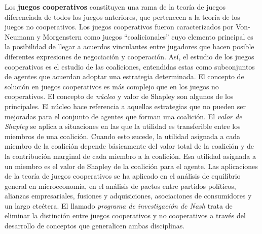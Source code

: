 \documentclass{nuevotema}
\begin{document}
Los \textbf{juegos cooperativos} constituyen una rama de la teoría de juegos diferenciada de todos los juegos anteriores, que pertenecen a la teoría de los juegos no cooperativos. Los juegos cooperativos fueron caracterizados por Von-Neumann y Morgenstern como juegos ``coalicionales'' cuyo elemento principal es la posibilidad de llegar a acuerdos vinculantes entre jugadores que hacen posible diferentes expresiones de negociación y cooperación. Así, el estudio de los juegos cooperativos es el estudio de las coaliciones, entendidas estas como subconjuntos de agentes que acuerdan adoptar una estrategia determinada. El concepto de solución en juegos cooperativos es más complejo que en los juegos no cooperativos. El concepto de \textit{núcleo} y valor de Shapley son algunos de los principales. El núcleo hace referencia a aquellas estrategias que no pueden ser mejoradas para el conjunto de agentes que forman una coalición. El \textit{valor de Shapley} se aplica a situaciones en las que la utilidad es transferible entre los miembros de una coalición. Cuando esto sucede, la utilidad asignada a cada miembro de la coalición depende básicamente del valor total de la coalición y de la contribución marginal de cada miembro a la coalición. Esa utilidad asignada a un miembro es el valor de Shapley de la coalición para el agente. Las aplicaciones de la teoría de juegos cooperativos se ha aplicado en el análisis de equilibrio general en microeconomía, en el análisis de pactos entre partidos políticos, alianzas empresariales, fusiones y adquisiciones, asociaciones de consumidores y un largo etcétera. El llamado \textit{programa de investigación de Nash} trata de eliminar la distinción entre juegos cooperativos y no cooperativos a través del desarrollo de conceptos que generalicen ambas disciplinas.
\end{document}
